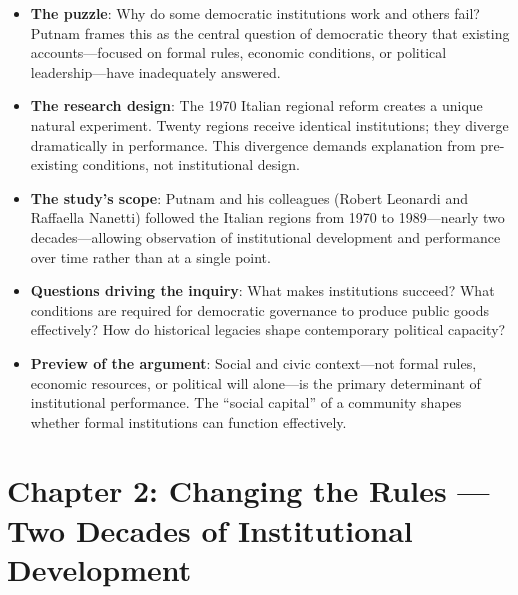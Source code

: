 \documentclass[12pt]{article}
\begin{document}
\begin{itemize}[leftmargin=*, itemsep=4pt]
    \item \textbf{The puzzle}: Why do some democratic institutions work and others fail? Putnam frames this as the central question of democratic theory that existing accounts---focused on formal rules, economic conditions, or political leadership---have inadequately answered.
    \item \textbf{The research design}: The 1970 Italian regional reform creates a unique natural experiment. Twenty regions receive identical institutions; they diverge dramatically in performance. This divergence demands explanation from pre-existing conditions, not institutional design.
    \item \textbf{The study's scope}: Putnam and his colleagues (Robert Leonardi and Raffaella Nanetti) followed the Italian regions from 1970 to 1989---nearly two decades---allowing observation of institutional development and performance over time rather than at a single point.
    \item \textbf{Questions driving the inquiry}: What makes institutions succeed? What conditions are required for democratic governance to produce public goods effectively? How do historical legacies shape contemporary political capacity?
    \item \textbf{Preview of the argument}: Social and civic context---not formal rules, economic resources, or political will alone---is the primary determinant of institutional performance. The ``social capital'' of a community shapes whether formal institutions can function effectively.
\end{itemize}

\section{Chapter 2: Changing the Rules --- Two Decades of Institutional Development}
\end{document}

